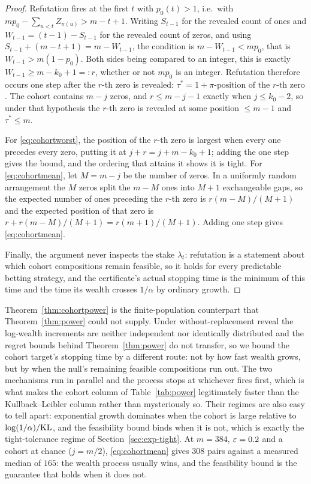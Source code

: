 \begin{proof}
Refutation fires at the first $t$ with $p_0(t) > 1$, i.e.\ with
$m p_0 - \sum_{u<t} Z_{\pi(u)} > m - t + 1$. Writing $S_{t-1}$ for the
revealed count of ones and $W_{t-1} = (t-1) - S_{t-1}$ for the revealed
count of zeros, and using $S_{t-1} + (m - t + 1) = m - W_{t-1}$, the
condition is $m - W_{t-1} < m p_0$, that is $W_{t-1} > m(1 - p_0)$. Both
sides being compared to an integer, this is exactly
$W_{t-1} \ge m - k_0 + 1 =: r$, whether or not $m p_0$ is an integer.
Refutation therefore occurs one step after the $r$-th zero is revealed:
$\tau^\ast = 1 + \pi\text{-position of the } r\text{-th zero}$. The cohort
contains $m - j$ zeros, and $r \le m - j - 1$ exactly when $j \le k_0 - 2$,
so under that hypothesis the $r$-th zero is revealed at some position
$\le m - 1$ and $\tau^\ast \le m$.

For \eqref{eq:cohortworst}, the position of the $r$-th zero is largest when
every one precedes every zero, putting it at $j + r = j + m - k_0 + 1$;
adding the one step gives the bound, and the ordering that attains it shows
it is tight. For \eqref{eq:cohortmean}, let $M = m - j$ be the number of
zeros. In a uniformly random arrangement the $M$ zeros split the $m - M$
ones into $M+1$ exchangeable gaps, so the expected number of ones preceding
the $r$-th zero is $r(m - M)/(M + 1)$ and the expected position of that zero
is $r + r(m-M)/(M+1) = r(m+1)/(M+1)$. Adding one step gives
\eqref{eq:cohortmean}.

Finally, the argument never inspects the stake $\lambda_t$: refutation is a
statement about which cohort compositions remain feasible, so it holds for
every predictable betting strategy, and the certificate's actual stopping
time is the minimum of this time and the time its wealth crosses $1/\alpha$
by ordinary growth.
\end{proof}

Theorem~\ref{thm:cohortpower} is the finite-population counterpart that
Theorem~\ref{thm:power} could not supply. Under without-replacement reveal
the log-wealth increments are neither independent nor identically
distributed and the regret bounds behind Theorem~\ref{thm:power} do not
transfer, so we bound the cohort target's stopping time by a different
route: not by how fast wealth grows, but by when the null's remaining
feasible compositions run out. The two mechanisms run in parallel and the
process stops at whichever fires first, which is what makes the cohort
column of Table~\ref{tab:power} legitimately faster than the
Kullback--Leibler column rather than mysteriously so. Their regimes are
also easy to tell apart: exponential growth dominates when the cohort is
large relative to $\log(1/\alpha)/\mathrm{KL}$, and the feasibility bound binds when
it is not, which is exactly the tight-tolerance regime of
Section~\ref{sec:exp-tight}. At $m = 384$, $\varepsilon = 0.2$ and a cohort at
chance ($j = m/2$), \eqref{eq:cohortmean} gives $308$ pairs against a
measured median of $165$: the wealth process usually wins, and the
feasibility bound is the guarantee that holds when it does not.

